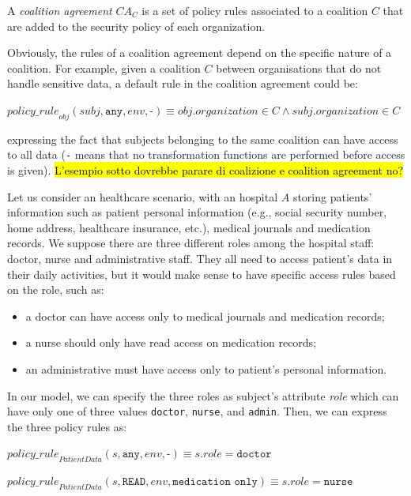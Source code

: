 \begin{definition}
A \textit{coalition a\-greement} $\textit{CA}_C$ is a set of policy rules associated to a coalition $C$ that are added to the security policy of each organization.
\end{definition}
Obviously, the rules of a coalition agreement depend on the specific nature of a coalition. For example, given a coalition $C$ between organisations that do not handle sensitive data, a default rule in the coalition agreement could be:
\vspace{0.3cm}

\noindent $\textit{policy\_rule}_{obj}(\textit{subj},\texttt{any},\textit{env},\texttt{-}) \equiv \textit{obj.organization} \in C  
 \land \textit{subj.organization} \in C 
$
\vspace{0.3cm}

\noindent expressing the fact that subjects belonging to the same coalition can have access to all data (\texttt{-} means that no transformation functions are performed before access is given).
\hl{L'esempio sotto dovrebbe parare di coalizione e coalition agreement no?}
\begin{example}
Let us consider an healthcare scenario, with an hospital $A$ storing patients' information such as patient personal information (e.g., social security number, home address, healthcare insurance, etc.), medical journals and medication records. We suppose there are three different roles among the hospital staff: doctor, nurse and administrative staff. 
They all need to access patient's data in their daily activities, but it would make sense to have specific access rules based on the role, such as:
\begin{itemize}
\item a doctor can have access only to medical journals and medication records;
\item a nurse should only have read access on medication records;
\item an administrative must have access only to patient's personal information.
\end{itemize}
In our model, we can specify the three roles as subject's attribute \textit{role}
which can have only one of three values \texttt{doctor}, \texttt{nurse}, and \texttt{admin}. Then, we can express the three policy rules as:

\vspace{0.3cm}

\noindent $\textit{policy\_rule}_{PatientData}(\textit{s},\texttt{any},\textit{env},\texttt{-}) \equiv \textit{s.role} = \texttt{doctor}
$
\vspace{0.3cm}

\noindent $\textit{policy\_rule}_{PatientData}(\textit{s},\texttt{READ},\textit{env},\texttt{medication only}) \equiv \textit{s.role} = \texttt{nurse}
$
\end{example}


